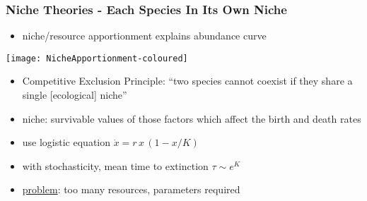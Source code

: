 \documentclass[dvipsnames]{beamer}
\begin{document}
\begin{frame}
\frametitle{Niche Theories - Each Species In Its Own Niche}
\normalsize{}
\vspace{0.7cm}
\begin{itemize}
	\item niche/resource apportionment explains abundance curve
\end{itemize}
\centering
\texttt{[image: NicheApportionment-coloured]}
\begin{itemize}
	\pause
	\item Competitive Exclusion Principle: ``two species cannot coexist if they share a single [ecological] niche''%
	\item niche: survivable values of those factors which affect the birth and death rates
	\item use logistic equation  $\dot{x} = r \, x \, \left(1-x/K\right)$
	\pause
	\item with stochasticity, mean time to extinction $\tau \sim e^K$ %
	\pause
	\item \underline{problem}: too many resources, parameters required
\end{itemize}
\end{frame}
\end{document}
